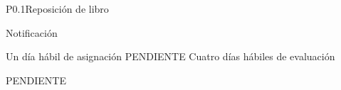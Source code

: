 \begin{Proceso}{P0.1}{Reposición de libro}
   { %
  }

   { %
    \begin{UClist}
      \UCli Notificación
    \end{UClist}
  }

   { %
  }

   { %
    \begin{UClist}
      \UCli Un día hábil  de asignación PENDIENTE
      \UCli Cuatro días  hábiles de evaluación
    \end{UClist}
  }
   { %
    \begin{UClist}
      \UCli PENDIENTE
    \end {UClist}
  }


\end{Proceso}

